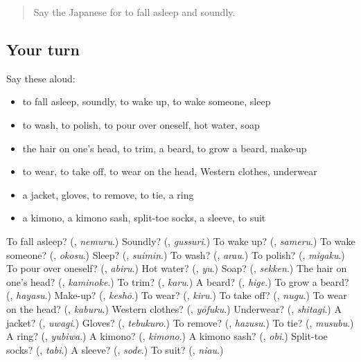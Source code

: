 \label{lesson:JA-R151-review-146-151}



\begin{quote}
Say the Japanese for to fall asleep and soundly.
\end{quote}

\subsection*{Your turn}
Say these aloud:

\begin{itemize}
\raggedright
  \item to fall asleep, soundly, to wake up, to wake someone, sleep
  \item to wash, to polish, to pour over oneself, hot water, soap
  \item the hair on one's head, to trim, a beard, to grow a beard, make-up
  \item to wear, to take off, to wear on the head, Western clothes, underwear
  \item a jacket, gloves, to remove, to tie, a ring
  \item a kimono, a kimono sash, split-toe socks, a sleeve, to suit
\end{itemize}

\begin{tcolorbox}[breakable,colback=teal!4,colframe=teal!35!black,title={Before you move on}]
To fall asleep? (\textbf{}, \emph{nemuru}.) Soundly? (\textbf{}, \emph{gussuri}.) To wake up? (\textbf{}, \emph{sameru}.) To wake someone? (\textbf{}, \emph{okosu}.) Sleep? (\textbf{}, \emph{suimin}.) To wash? (\textbf{}, \emph{arau}.) To polish? (\textbf{}, \emph{migaku}.) To pour over oneself? (\textbf{}, \emph{abiru}.) Hot water? (\textbf{}, \emph{yu}.) Soap? (\textbf{}, \emph{sekken}.) The hair on one's head? (\textbf{}, \emph{kaminoke}.) To trim? (\textbf{}, \emph{karu}.) A beard? (\textbf{}, \emph{hige}.) To grow a beard? (\textbf{}, \emph{hayasu}.) Make-up? (\textbf{}, \emph{keshō}.) To wear? (\textbf{}, \emph{kiru}.) To take off? (\textbf{}, \emph{nugu}.) To wear on the head? (\textbf{}, \emph{kaburu}.) Western clothes? (\textbf{}, \emph{yōfuku}.) Underwear? (\textbf{}, \emph{shitagi}.) A jacket? (\textbf{}, \emph{uwagi}.) Gloves? (\textbf{}, \emph{tebukuro}.) To remove? (\textbf{}, \emph{hazusu}.) To tie? (\textbf{}, \emph{musubu}.) A ring? (\textbf{}, \emph{yubiwa}.) A kimono? (\textbf{}, \emph{kimono}.) A kimono sash? (\textbf{}, \emph{obi}.) Split-toe socks? (\textbf{}, \emph{tabi}.) A sleeve? (\textbf{}, \emph{sode}.) To suit? (\textbf{}, \emph{niau}.)
\end{tcolorbox}
